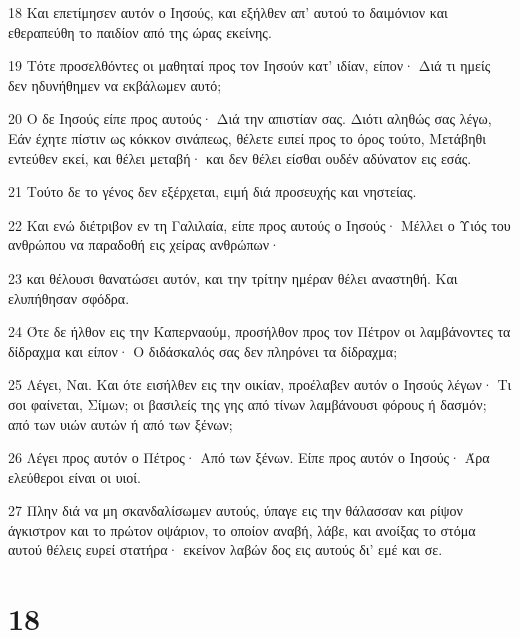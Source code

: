 \par 18 Και επετίμησεν αυτόν ο Ιησούς, και εξήλθεν απ' αυτού το δαιμόνιον και εθεραπεύθη το παιδίον από της ώρας εκείνης.
\par 19 Τότε προσελθόντες οι μαθηταί προς τον Ιησούν κατ' ιδίαν, είπον· Διά τι ημείς δεν ηδυνήθημεν να εκβάλωμεν αυτό;
\par 20 Ο δε Ιησούς είπε προς αυτούς· Διά την απιστίαν σας. Διότι αληθώς σας λέγω, Εάν έχητε πίστιν ως κόκκον σινάπεως, θέλετε ειπεί προς το όρος τούτο, Μετάβηθι εντεύθεν εκεί, και θέλει μεταβή· και δεν θέλει είσθαι ουδέν αδύνατον εις εσάς.
\par 21 Τούτο δε το γένος δεν εξέρχεται, ειμή διά προσευχής και νηστείας.
\par 22 Και ενώ διέτριβον εν τη Γαλιλαία, είπε προς αυτούς ο Ιησούς· Μέλλει ο Υιός του ανθρώπου να παραδοθή εις χείρας ανθρώπων·
\par 23 και θέλουσι θανατώσει αυτόν, και την τρίτην ημέραν θέλει αναστηθή. Και ελυπήθησαν σφόδρα.
\par 24 Ότε δε ήλθον εις την Καπερναούμ, προσήλθον προς τον Πέτρον οι λαμβάνοντες τα δίδραχμα και είπον· Ο διδάσκαλός σας δεν πληρόνει τα δίδραχμα;
\par 25 Λέγει, Ναι. Και ότε εισήλθεν εις την οικίαν, προέλαβεν αυτόν ο Ιησούς λέγων· Τι σοι φαίνεται, Σίμων; οι βασιλείς της γης από τίνων λαμβάνουσι φόρους ή δασμόν; από των υιών αυτών ή από των ξένων;
\par 26 Λέγει προς αυτόν ο Πέτρος· Από των ξένων. Είπε προς αυτόν ο Ιησούς· Άρα ελεύθεροι είναι οι υιοί.
\par 27 Πλην διά να μη σκανδαλίσωμεν αυτούς, ύπαγε εις την θάλασσαν και ρίψον άγκιστρον και το πρώτον οψάριον, το οποίον αναβή, λάβε, και ανοίξας το στόμα αυτού θέλεις ευρεί στατήρα· εκείνον λαβών δος εις αυτούς δι' εμέ και σε.

\chapter{18}

